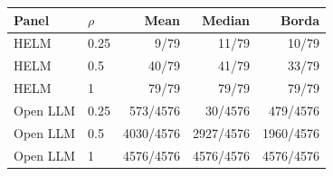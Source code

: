 \begin{tabular}{llrrr}
\toprule
Panel & $\rho$ & Mean & Median & Borda \\
\midrule
HELM & 0.25 & 9/79 & 11/79 & 10/79 \\
HELM & 0.5 & 40/79 & 41/79 & 33/79 \\
HELM & 1 & 79/79 & 79/79 & 79/79 \\
Open LLM & 0.25 & 573/4576 & 30/4576 & 479/4576 \\
Open LLM & 0.5 & 4030/4576 & 2927/4576 & 1960/4576 \\
Open LLM & 1 & 4576/4576 & 4576/4576 & 4576/4576 \\
\bottomrule
\end{tabular}